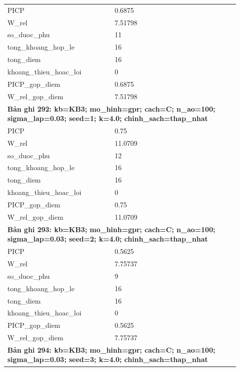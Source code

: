 \begin{longtable}{p{0.43\linewidth}p{0.50\linewidth}}
PICP & 0.6875 \\
W\_\allowbreak rel & 7.51798 \\
so\_\allowbreak duoc\_\allowbreak phu & 11 \\
tong\_\allowbreak khoang\_\allowbreak hop\_\allowbreak le & 16 \\
tong\_\allowbreak diem & 16 \\
khoang\_\allowbreak thieu\_\allowbreak hoac\_\allowbreak loi & 0 \\
PICP\_\allowbreak gop\_\allowbreak diem & 0.6875 \\
W\_\allowbreak rel\_\allowbreak gop\_\allowbreak diem & 7.51798 \\
\midrule
\multicolumn{2}{p{0.95\linewidth}}{\textbf{Bản ghi 292: kb=KB3; mo\_hinh=gpr; cach=C; n\_ao=100; sigma\_lap=0.03; seed=1; k=4.0; chinh\_sach=thap\_nhat}} \\
PICP & 0.75 \\
W\_\allowbreak rel & 11.0709 \\
so\_\allowbreak duoc\_\allowbreak phu & 12 \\
tong\_\allowbreak khoang\_\allowbreak hop\_\allowbreak le & 16 \\
tong\_\allowbreak diem & 16 \\
khoang\_\allowbreak thieu\_\allowbreak hoac\_\allowbreak loi & 0 \\
PICP\_\allowbreak gop\_\allowbreak diem & 0.75 \\
W\_\allowbreak rel\_\allowbreak gop\_\allowbreak diem & 11.0709 \\
\midrule
\multicolumn{2}{p{0.95\linewidth}}{\textbf{Bản ghi 293: kb=KB3; mo\_hinh=gpr; cach=C; n\_ao=100; sigma\_lap=0.03; seed=2; k=4.0; chinh\_sach=thap\_nhat}} \\
PICP & 0.5625 \\
W\_\allowbreak rel & 7.75737 \\
so\_\allowbreak duoc\_\allowbreak phu & 9 \\
tong\_\allowbreak khoang\_\allowbreak hop\_\allowbreak le & 16 \\
tong\_\allowbreak diem & 16 \\
khoang\_\allowbreak thieu\_\allowbreak hoac\_\allowbreak loi & 0 \\
PICP\_\allowbreak gop\_\allowbreak diem & 0.5625 \\
W\_\allowbreak rel\_\allowbreak gop\_\allowbreak diem & 7.75737 \\
\midrule
\multicolumn{2}{p{0.95\linewidth}}{\textbf{Bản ghi 294: kb=KB3; mo\_hinh=gpr; cach=C; n\_ao=100; sigma\_lap=0.03; seed=3; k=4.0; chinh\_sach=thap\_nhat}} \\

\end{longtable}

